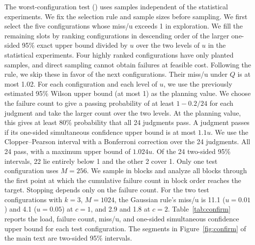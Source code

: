 The worst-configuration test () uses samples independent of the statistical experiments. We fix the selection rule and sample sizes before sampling. We first select the five configurations whose miss/u exceeds 1 in exploration. We fill the remaining slots by ranking configurations in descending order of the larger one-sided 95\% exact upper bound divided by $u$ over the two levels of $u$ in the statistical experiments. Four highly ranked configurations have only planted samples, and direct sampling cannot obtain failures at feasible cost. Following the rule, we skip these in favor of the next configurations. Their miss/u under $Q$ is at most 1.02. For each configuration and each level of $u$, we use the previously estimated 95\% Wilson upper bound (at most 1) as the planning value. We choose the failure count to give a passing probability of at least $1-0.2/24$ for each judgment and take the larger count over the two levels. At the planning value, this gives at least 80\% probability that all 24 judgments pass. A judgment passes if its one-sided simultaneous confidence upper bound is at most $1.1u$. We use the Clopper--Pearson interval with a Bonferroni correction over the 24 judgments. All 24 pass, with a maximum upper bound of $1.024u$. Of the 24 two-sided 95\% intervals, 22 lie entirely below 1 and the other 2 cover 1. Only one test configuration uses $M=256$. We sample in blocks and analyze all blocks through the first point at which the cumulative failure count in block order reaches the target. Stopping depends only on the failure count. For the two test configurations with $k=3$, $M=1024$, the Gaussian rule's miss/u is 11.1 ($u=0.01$) and 4.1 ($u=0.05$) at $c=1$, and 2.9 and 1.8 at $c=2$. Table~\ref{tab:confirm} reports the load, failure count, miss/u, and one-sided simultaneous confidence upper bound for each test configuration. The segments in Figure~\ref{fig:confirm} of the main text are two-sided 95\% intervals.

